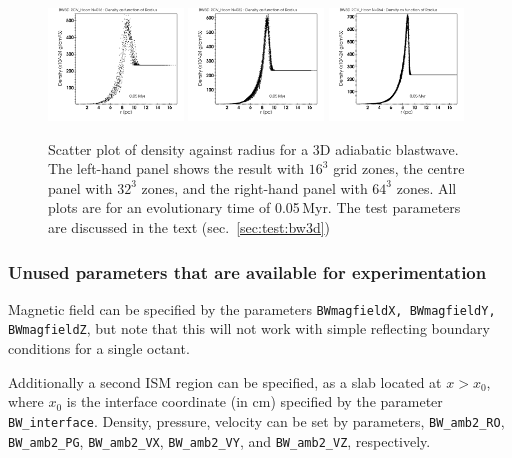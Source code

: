 \documentclass[a4paper,11pt]{report}
\begin{document}
\begin{figure}
\centering
\includegraphics[width=0.32\textwidth]{figs/Density_BWcrt3Dpll_Octant_NR016_RCV_Hcorr_011.png}
\includegraphics[width=0.32\textwidth]{figs/Density_BWcrt3Dpll_Octant_NR032_RCV_Hcorr_011.png}
\includegraphics[width=0.32\textwidth]{figs/Density_BWcrt3Dpll_Octant_NR064_RCV_Hcorr_011.png}
\caption{
  Scatter plot of density against radius for a 3D adiabatic blastwave.
  The left-hand panel shows the result with $16^3$ grid zones, the centre panel with $32^3$ zones, and the right-hand panel with $64^3$ zones.
  All plots are for an evolutionary time of 0.05\,Myr.
  The test parameters are discussed in the text (sec.~\ref{sec:test:bw3d})
    }
\label{fig:bw3d_hd_adi_n032}
\end{figure}

\subsubsection{Unused parameters that are available for experimentation}
Magnetic field can be specified by the parameters \lstinline|BWmagfieldX, BWmagfieldY, BWmagfieldZ|, but note that this will not work with simple reflecting boundary conditions for a single octant.

Additionally a second ISM region can be specified, as a slab located at $x>x_0$, where $x_0$ is the interface coordinate (in cm) specified by the parameter \lstinline|BW_interface|.
Density, pressure, velocity can be set by parameters, \lstinline|BW_amb2_RO|, \lstinline|BW_amb2_PG|, \lstinline|BW_amb2_VX|, \lstinline|BW_amb2_VY|, and \lstinline|BW_amb2_VZ|, respectively.
\end{document}
